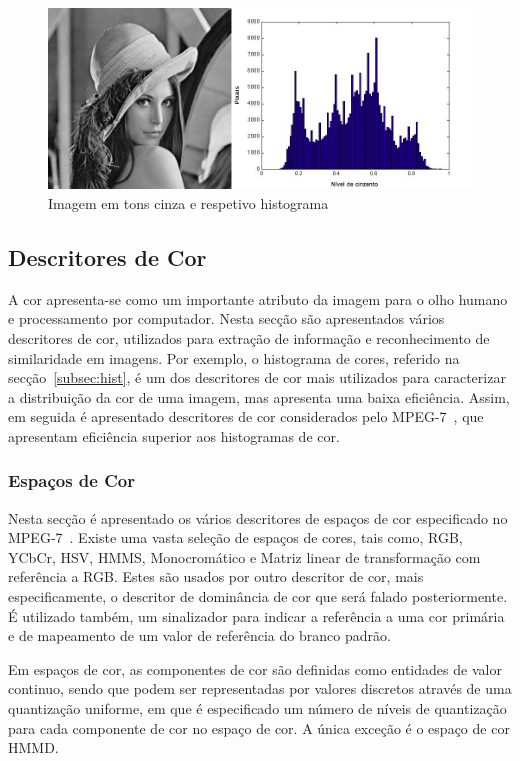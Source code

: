 \begin{figure}[h]
\centering
\includegraphics[width=0.8\linewidth]{./figures/histlena}
\caption{Imagem em tons cinza e respetivo histograma }
\label{fig:lenahist}
\end{figure}

\subsection{Descritores de Cor}

A cor apresenta-se como um importante atributo da imagem para o olho humano e processamento por computador. Nesta secção são apresentados vários descritores de cor, utilizados para extração de informação e reconhecimento de similaridade em imagens. Por exemplo, o histograma de cores, referido na secção~\ref{subsec:hist}, é um dos descritores de cor mais utilizados para caracterizar a distribuição da cor de uma imagem, mas apresenta uma baixa eficiência. Assim, em seguida é apresentado descritores de cor considerados pelo MPEG-7~\cite{Manjunath2001, Christopoulos2000, Cieplinski2001, Ite-vil}, que apresentam eficiência superior aos histogramas de cor.


\subsubsection{Espaços de Cor} \label{subsubsec:space}

Nesta secção é apresentado os vários descritores de espaços de cor especificado no MPEG-7~\cite{Ite-vil}. Existe uma vasta seleção de espaços de cores, tais como, RGB, YCbCr, HSV, HMMS, Monocromático e Matriz linear de transformação com referência a RGB. Estes são usados por outro descritor de cor, mais especificamente, o descritor de dominância de cor que será falado posteriormente. É utilizado também, um sinalizador para indicar a referência a uma cor primária e de mapeamento de um valor de referência do branco padrão. 

Em espaços de cor, as componentes de cor são definidas como entidades de valor continuo, sendo que podem ser representadas por valores discretos através de uma quantização uniforme, em que é especificado um número de níveis de quantização para cada componente de cor no espaço de cor. A única exceção é o espaço de cor HMMD.


